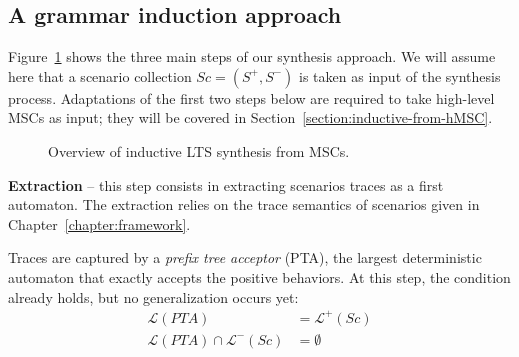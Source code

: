 
\subsection{A grammar induction approach\label{subsection:inductive-synthesis-approach}}

Figure~\ref{image:inductive-synthesis-overview} shows the three main steps of our synthesis approach. We will assume here that a scenario collection $Sc = (S^+, S^-)$ is taken as input of the synthesis process. Adaptations of the first two steps below are required to take high-level MSCs as input; they will be covered in Section~\ref{section:inductive-from-hMSC}.

\begin{figure}\centering
  \caption{Overview of inductive LTS synthesis from MSCs.\label{image:inductive-synthesis-overview}}
\end{figure}

\noindent \textbf{Extraction} -- this step consists in extracting scenarios traces as a first automaton. The extraction relies on the trace semantics of scenarios given in Chapter~\ref{chapter:framework}. 

Traces are captured by a \emph{prefix tree acceptor} (PTA), the largest deterministic automaton that exactly accepts the positive behaviors. At this step, the  condition already holds, but no generalization occurs yet:
\begin{align*}
\mathcal{L}(PTA) &= \mathcal{L}^+(Sc)\\
\mathcal{L}(PTA) \cap \mathcal{L}^-(Sc) &= \emptyset
\end{align*}

